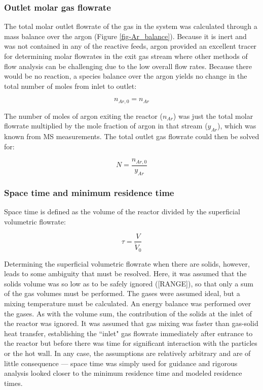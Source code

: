 \documentclass[11pt,twocolumn]{article}
\begin{document}
\subsubsection*{Outlet molar gas flowrate}

The total molar outlet flowrate of the gas in the system was calculated through a mass balance over the argon (Figure \ref{fig-Ar_balance}).  Because it is inert and was not contained in any of the reactive feeds, argon provided an excellent tracer for determining molar flowrates in the exit gas stream where other methods of flow analysis can be challenging due to the low overall flow rates.  Because there would be no reaction, a species balance over the argon yields no change in the total number of moles from inlet to outlet:

\begin{equation}
	n_{Ar,0} = n_{Ar}
\end{equation}

The number of moles of argon exiting the reactor ($n_{Ar}$) was just the total molar flowrate multiplied by the mole fraction of argon in that stream ($y_{Ar}$), which was known from MS measurements.  The total outlet gas flowrate could then be solved for:

\begin{equation}
	N = \frac{n_{Ar,0}}{y_{Ar}}
\end{equation}

\subsubsection*{Space time and minimum residence time}
Space time is defined as the volume of the reactor divided by the superficial volumetric flowrate:

\begin{equation}
	\tau = \frac{V}{\dot{V}_{0}}
\end{equation}

Determining the superficial volumetric flowrate when there are solids, however, leads to some ambiguity that must be resolved.  Here, it was assumed that the solids volume was so low as to be safely ignored ([RANGE]), so that only a sum of the gas volumes must be performed.  The gases were assumed ideal, but a mixing temperature must be calculated.  An energy balance was performed over the gases.  As with the volume sum, the contribution of the solids at the inlet of the reactor was ignored.  It was assumed that gas mixing was faster than gas-solid heat transfer, establishing the ``inlet" gas flowrate immediately after entrance to the reactor but before there was time for significant interaction with the particles or the hot wall.  In any case, the assumptions are relatively arbitrary and are of little consequence --- space time was simply used for guidance and rigorous analysis looked closer to the minimum residence time and modeled residence times.
\end{document}
